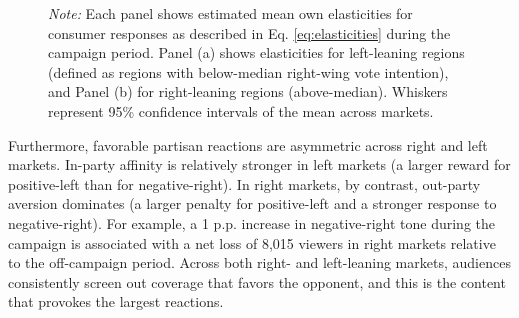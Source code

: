 \documentclass[12pt]{article}
\begin{document}
\begin{figure}[!htbp]
	 	\vspace{0.5em} %
	 	
	 	\captionsetup{justification=justified}
	 	\caption*{\small  \textit{Note:}  Each panel shows estimated mean own elasticities for consumer responses  as described in Eq. \eqref{eq:elasticities} during the campaign period. Panel (a) shows elasticities for left-leaning regions (defined as regions with below-median right-wing vote intention), and Panel (b) for right-leaning regions (above-median). Whiskers represent 95\% confidence intervals of the mean across markets.}
	 	
	 \end{figure}
	 
Furthermore, favorable partisan reactions are asymmetric across right and left markets. In-party affinity is relatively stronger in left markets (a larger reward for positive-left than for negative-right). In right markets, by contrast, out-party aversion dominates (a larger penalty for positive-left and a stronger response to negative-right). For example, a 1 p.p. increase in negative-right tone during the campaign is associated with a net loss of 8,015 viewers in right markets relative to the off-campaign period. Across both right- and left-leaning markets, audiences consistently screen out coverage that favors the opponent, and this is the content that provokes the largest reactions.

	
	
	
	

\end{document}
